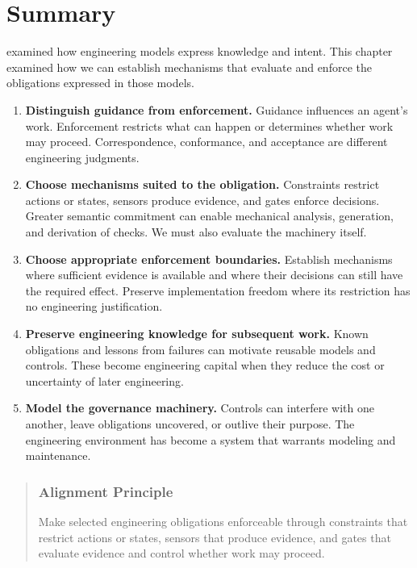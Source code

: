 


\chapter{Summary}

 examined how engineering models express knowledge and intent. This chapter examined how we can establish mechanisms that evaluate and enforce the obligations expressed in those models.

\begin{enumerate}
\def\labelenumi{\arabic{enumi}.}
\tightlist
\item
  \textbf{Distinguish guidance from enforcement.} Guidance influences an agent's work. Enforcement restricts what can happen or determines whether work may proceed. Correspondence, conformance, and acceptance are different engineering judgments.
\item
  \textbf{Choose mechanisms suited to the obligation.} Constraints restrict actions or states, sensors produce evidence, and gates enforce decisions. Greater semantic commitment can enable mechanical analysis, generation, and derivation of checks. We must also evaluate the machinery itself.
\item
  \textbf{Choose appropriate enforcement boundaries.} Establish mechanisms where sufficient evidence is available and where their decisions can still have the required effect. Preserve implementation freedom where its restriction has no engineering justification.
\item
  \textbf{Preserve engineering knowledge for subsequent work.} Known obligations and lessons from failures can motivate reusable models and controls. These become engineering capital when they reduce the cost or uncertainty of later engineering.
\item
  \textbf{Model the governance machinery.} Controls can interfere with one another, leave obligations uncovered, or outlive their purpose. The engineering environment has become a system that warrants modeling and maintenance.
\end{enumerate}



\begin{quote}
\mbox{}%
\subsection{Alignment Principle}\label{heading:alignment-principle}

Make selected engineering obligations enforceable through constraints that restrict actions or states, sensors that produce evidence, and gates that evaluate evidence and control whether work may proceed.
\end{quote}

